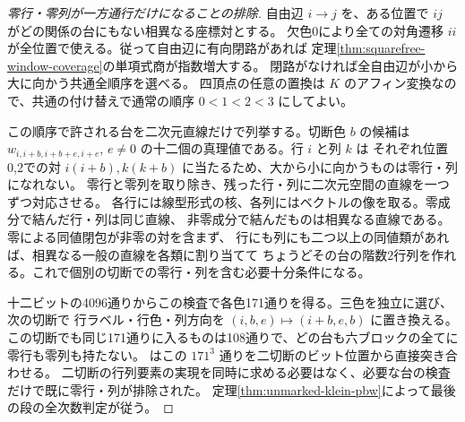 \begin{proof}[零行・零列が一方通行だけになることの排除]
自由辺 $i\to j$ を、ある位置で $ij$ がどの関係の台にもない相異なる座標対とする。
欠色0により全ての対角遷移 $ii$ が全位置で使える。従って自由辺に有向閉路があれば
定理\ref{thm:squarefree-window-coverage}の単項式商が指数増大する。
閉路がなければ全自由辺が小から大に向かう共通全順序を選べる。
四頂点の任意の置換は $K$ のアフィン変換なので、共通の付け替えで通常の順序 $0<1<2<3$ にしてよい。

この順序で許される台を二次元直線だけで列挙する。切断色 $b$ の候補は
$w_{i,i+b,i+b+e,i+e}$, $e\ne0$ の十二個の真理値である。行 $i$ と列 $k$ は
それぞれ位置0,2での対 $i(i+b),k(k+b)$ に当たるため、大から小に向かうものは零行・列になれない。
零行と零列を取り除き、残った行・列に二次元空間の直線を一つずつ対応させる。
各行には線型形式の核、各列にはベクトルの像を取る。零成分で結んだ行・列は同じ直線、
非零成分で結んだものは相異なる直線である。零による同値閉包が非零の対を含まず、
行にも列にも二つ以上の同値類があれば、相異なる一般の直線を各類に割り当てて
ちょうどその台の階数2行列を作れる。これで個別の切断での零行・列を含む必要十分条件になる。

十二ビットの4096通りからこの検査で各色171通りを得る。三色を独立に選び、次の切断で
行ラベル・行色・列方向を $(i,b,e)\mapsto(i+b,e,b)$ に置き換える。
この切断でも同じ171通りに入るものは108通りで、どの台も六ブロックの全てに零行も零列も持たない。
 はこの $171^3$ 通りを二切断のビット位置から直接突き合わせる。
二切断の行列要素の実現を同時に求める必要はなく、必要な台の検査だけで既に零行・列が排除された。
定理\ref{thm:unmarked-klein-pbw}によって最後の段の全次数判定が従う。
\end{proof}
